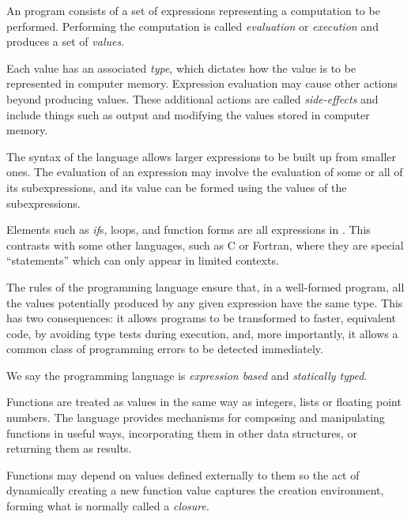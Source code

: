 An \asharp{} program consists of a set of expressions
representing a computation to be performed.
Performing the computation is called {\em evaluation} or {\em execution}
and produces a set of {\em values}.

Each value has an associated {\em type}, which dictates how the value
is to be represented in computer memory.
Expression evaluation may cause other actions beyond producing values.
These additional actions are called {\em side-effects} and include
things such as output and modifying the values stored in computer memory.

The syntax of the language allows larger expressions to be built up from
smaller ones.  The evaluation of an expression
may involve the evaluation of some or all of its subexpressions,
and its value can be formed using the values of the subexpressions.

Elements such as {\em if\/}s, loops, and function forms
are all expressions in \asharp{}.
This contrasts with some other languages, such as C or Fortran,
where they are special ``statements'' 
which can only appear in limited contexts.

The rules of the \asharp{} programming language ensure that, in a
well-formed program, all the values potentially produced by any given
expression have the same type.
This has two consequences:
it allows programs to be transformed to faster, equivalent code,
by avoiding type tests during execution, and, more importantly,
it allows a common class of programming errors to be detected immediately.

We say the \asharp{} programming language is {\em expression based}
and {\em statically typed}.


Functions  are treated as values in the same way as integers,
lists or floating point numbers.  
The language provides mechanisms for composing and 
manipulating functions in useful ways, 
incorporating them in other data structures, or returning them as results.  

Functions may depend on values defined externally to them so the act 
of dynamically creating a new function value captures the creation environment,
forming what is normally called a {\em closure}.

